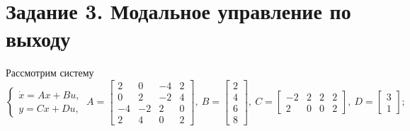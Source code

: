 \documentclass[a4paper, 12pt]{article}
\begin{document}
    \section{Задание 3. Модальное управление по выходу}
    Рассмотрим систему
    $$
    \begin{cases}
        \dot{x}=Ax+Bu,\\
        y=Cx+Du,
    \end{cases}\ A=\begin{bmatrix}
        2 &0 &-4 &2\\
        0 &2 &-2 &4\\
        -4 &-2 &2 &0\\
        2 &4 &0 &2
    \end{bmatrix},\ B=\begin{bmatrix}
        2\\
        4\\
        6\\
        8
    \end{bmatrix},\ C=\begin{bmatrix}
        -2 &2 &2 &2\\
        2 &0 &0 &2
    \end{bmatrix},\ D=\begin{bmatrix}
        3\\
        1
    \end{bmatrix};
    $$
\end{document}
